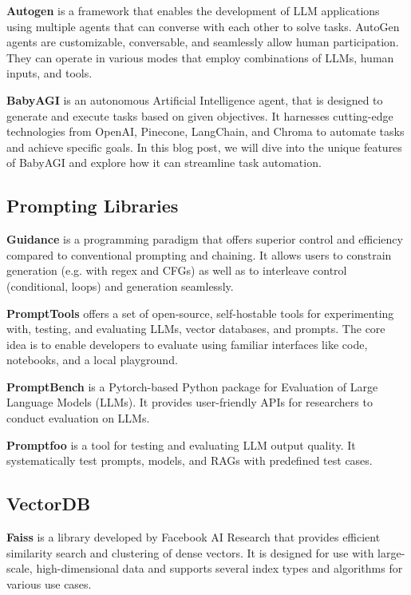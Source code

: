 \documentclass[conference]{IEEEtran}
\begin{document}
\textbf{Autogen} \cite{autogen} is a framework that enables the development of LLM applications using multiple agents that can converse with each other to solve tasks. AutoGen agents are customizable, conversable, and seamlessly allow human participation. They can operate in various modes that employ combinations of LLMs, human inputs, and tools.

\textbf{BabyAGI} \cite{babyagi} is an autonomous Artificial Intelligence agent, that is designed to generate and execute tasks based on given objectives. It harnesses cutting-edge technologies from OpenAI, Pinecone, LangChain, and Chroma to automate tasks and achieve specific goals. In this blog post, we will dive into the unique features of BabyAGI and explore how it can streamline task automation.


\subsection{Prompting Libraries}

\textbf{Guidance} \cite{guidance} is a programming paradigm that offers superior control and efficiency compared to conventional prompting and chaining. It allows users to constrain generation (e.g. with regex and CFGs) as well as to interleave control (conditional, loops) and generation seamlessly.

\textbf{PromptTools} \cite{prompttools} offers a set of open-source, self-hostable tools for experimenting with, testing, and evaluating LLMs, vector databases, and prompts. The core idea is to enable developers to evaluate using familiar interfaces like code, notebooks, and a local playground.

\textbf{PromptBench} \cite{promptbench}  is a Pytorch-based Python package for Evaluation of Large Language Models (LLMs). It provides user-friendly APIs for researchers to conduct evaluation on LLMs.

\textbf{Promptfoo} \cite{promptfoo} is a tool for testing and evaluating LLM output quality. It systematically test prompts, models, and RAGs with predefined test cases.



\subsection{VectorDB}
\textbf{Faiss} \cite{faiss} is a library developed by Facebook AI Research that provides efficient similarity search and clustering of dense vectors. It is designed for use with large-scale, high-dimensional data and supports several index types and algorithms for various use cases.
\end{document}
